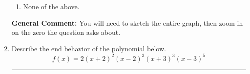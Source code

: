 \documentclass{extbook}[14pt]
\newcommand{\litem}[1]{\item #1

\rule{\textwidth}{0.4pt}}
\begin{document}
\begin{enumerate}
{\begin{enumerate}[label=\Alph*.]
\item None of the above.\end{enumerate}
\textbf{General Comment:} You will need to sketch the entire graph, then zoom in on the zero the question asks about.
}
\litem{
Describe the end behavior of the polynomial below.
\[ f(x) = 2(x + 2)^{2}(x - 2)^{3}(x + 3)^{3}(x - 3)^{5} \]

}
\end{enumerate}
\end{document}
